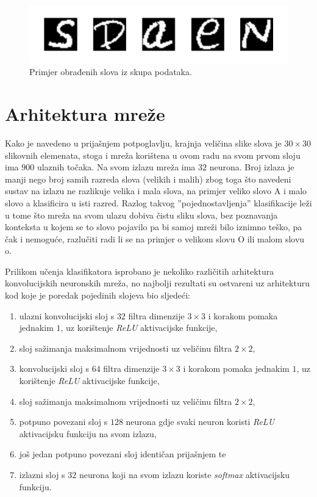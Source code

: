 \begin{figure}[htb]
    \centering
    \includegraphics[width=11.5cm]{images/dataset_example.pdf}
    \caption{Primjer obrađenih slova iz skupa podataka.}
    \label{fig:dataset_example}
\end{figure}

\section{Arhitektura mreže}

Kako je navedeno u prijašnjem potpoglavlju, krajnja veličina slike slova je $30 \times 30$ slikovnih elemenata, stoga i mreža korištena u ovom radu na svom prvom sloju ima $900$ ulaznih točaka. Na svom izlazu mreža ima $32$ neurona. Broj izlaza je manji nego broj samih razreda slova (velikih i malih) zbog toga što navedeni sustav na izlazu ne razlikuje velika i mala slova, na primjer veliko slovo A i malo slovo a klasificira u isti razred. Razlog takvog ''pojednostavljenja'' klasifikacije leži u tome što mreža na svom ulazu dobiva čistu sliku slova, bez poznavanja konteksta u kojem se to slovo pojavilo pa bi samoj mreži bilo iznimno teško, pa čak i nemoguće, razlučiti radi li se na primjer o velikom slovu O ili malom slovu o.

Prilikom učenja klasifikatora isprobano je nekoliko različitih arhitektura konvolucijskih neuronskih mreža, no najbolji rezultati su ostvareni uz arhitekturu kod koje je poredak pojedinih slojeva bio sljedeći:

\begin{enumerate}
    \item ulazni konvolucijski sloj s $32$ filtra dimenzije $3 \times 3$ i korakom pomaka jednakim $1$, uz korištenje \emph{ReLU} aktivacijske funkcije,
    \item sloj sažimanja maksimalnom vrijednosti uz veličinu filtra $2 \times 2$,
    \item konvolucijski sloj s $64$ filtra dimenzije $3 \times 3$ i korakom pomaka jednakim $1$, uz korištenje \emph{ReLU} aktivacijske funkcije,
    \item sloj sažimanja maksimalnom vrijednosti uz veličinu filtra $2 \times 2$,
    \item potpuno povezani sloj s $128$ neurona gdje svaki neuron koristi \emph{ReLU} aktivacijsku funkciju na svom izlazu,
    \item još jedan potpuno povezani sloj identičan prijašnjem te
    \item izlazni sloj s $32$ neurona koji na svom izlazu koriste \emph{softmax} aktivacijsku funkciju.
\end{enumerate}

